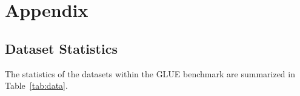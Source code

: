 \documentclass{article} \usepackage{iclr2021_conference,times}
\theoremstyle{plain}
\begin{document}
\nocite{araci2019finbert}
\nocite{yang2020finbert}
\nocite{lee2020biobert}
\nocite{beltagy2019scibert}
\nocite{gururangan2020don}
\nocite{zhang2015character}
\nocite{kiesel2019semeval}
\nocite{Luan2018MultiTaskIO}
\nocite{Jurgens2018MeasuringTE}
\nocite{zellers2019defending}
\nocite{lo2020s2orc}
\nocite{brown2020language}
\nocite{radford2019language}
\nocite{srivastava2014dropout}
\nocite{vaswani2017attention}
\nocite{wang2013variance}
\nocite{raffel2019exploring}
\nocite{lan2019albert}
\nocite{wang2018glue}
\nocite{alain2015variance}
\nocite{gu2020train}
\nocite{radford2018improving}
\nocite{peters2018deep}
\nocite{chen2020variance}
\nocite{Ahmed2017WeightedTN}
\nocite{Song2019MASSMS}
\nocite{dong2019unified}
\nocite{Zhang2019ERNIEEL}
\nocite{wang2019structbert}
\nocite{he2020deberta}
\nocite{lewis2019bart}
\nocite{clark2019electra}
\nocite{sun2019ernie}
\nocite{joshi2019spanbert}
\nocite{bao2020unilmv2}
\nocite{yang2019xlnet}
\nocite{kingma2014adam}
\nocite{zhu2015aligning}
\nocite{neil_acourse_in_probability}
\nocite{johnson2013accelerating}
\nocite{zhang2019stochastic}
\nocite{xiao2014proximal}
\nocite{liu2019roberta}
\nocite{devlin2018bert}




\newpage

\appendix
\section{Appendix}
\subsection{Dataset Statistics}
\label{ap:data}
The statistics of the datasets within the GLUE benchmark are summarized in Table~\ref{tab:data}.
\end{document}
